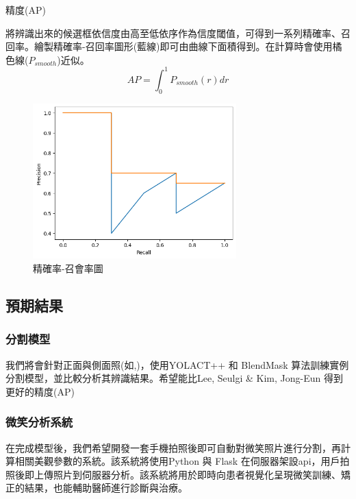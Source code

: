 \df 精度(AP)

將辨識出來的候選框依信度由高至低依序作為信度閾值，可得到一系列精確率、召回率。繪製精確率-召回率圖形(藍線)即可由曲線下面積得到。在計算時會使用橘色線($P_{smooth}$)近似。
$$
AP=\int_{0}^{1}P_{smooth}(r) dr
$$
\begin{figure}[H]
  \centering
  \includegraphics[width=0.7\textwidth,height=6cm]{paste_src/2023-02-07-15-35-26.png}
  \caption{精確率-召會率圖}
  \label{fig:pr}
\end{figure}

\subsection{預期結果}
\subsubsection{分割模型}
我們將會針對正面與側面照(如,)，使用YOLACT++ 和 BlendMask 算法訓練實例分割模型，並比較分析其辨識結果。希望能比Lee, Seulgi \& Kim, Jong-Eun 得到更好的精度(AP)

\subsubsection{微笑分析系統}

在完成模型後，我們希望開發一套手機拍照後即可自動對微笑照片進行分割，再計算相關美觀參數的系統。該系統將使用Python 與 Flask 在伺服器架設api，用戶拍照後即上傳照片到伺服器分析。該系統將用於即時向患者視覺化呈現微笑訓練、矯正的結果，也能輔助醫師進行診斷與治療。


\begin{figure}[!htp]
  \centering
\end{figure}


